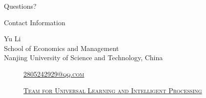 \documentclass[
 size=14pt,
 paper=smartboard,  %
 mode=present, 		%
 display=slides, 	%
 style=tuliplab,  	%
 pauseslide,
 fleqn,leqno]{powerdot}
\begin{document}
%
\begin{slide}[toc=,bm=]{Questions?}
\begin{center}
\begin{figure}
\end{figure}
\end{center}
\end{slide}


\begin{wideslide}[toc=,bm=]{Contact Information}
\centering
{}
\twocolumn[
lcolwidth=0.35\linewidth,
rcolwidth=0.65\linewidth
]
{
}
{
Yu Li\\
School of Economics and Management\\
Nanjing University of Science and Technology, China
\begin{description}
 \item[\textcolor{orange}{\faEnvelope}] \href{mailto:2805242929@qq.com}
 {\textsc{\footnotesize{2805242929@qq.com}}}

 \item[\textcolor{orange}{\faHome}] \href{http://www.tulip.org.au}
 {\textsc{\footnotesize{Team for Universal Learning and Intelligent Processing}}}
\end{description}
}
\end{wideslide}
\end{document}
